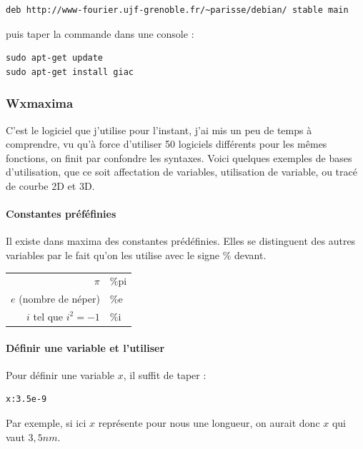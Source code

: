 \documentclass[a4paper,twoside]{article}
\begin{document}
\begin{verbatim}
deb http://www-fourier.ujf-grenoble.fr/~parisse/debian/ stable main
\end{verbatim}

puis taper la commande dans une console :

\begin{verbatim}
sudo apt-get update
sudo apt-get install giac
\end{verbatim}


\subsubsection{Wxmaxima}
C'est le logiciel que j'utilise pour l'instant, j'ai mis un peu de temps à comprendre, vu qu'à force d'utiliser 50 logiciels différents pour les mêmes fonctions, on finit par confondre les syntaxes. Voici quelques exemples de bases d'utilisation, que ce soit affectation de variables, utilisation de variable, ou tracé de courbe 2D et 3D.

\paragraph{Constantes préféfinies}\label{maxima:constantes}
Il existe dans maxima des constantes prédéfinies. Elles se distinguent des autres variables par le fait qu'on les utilise avec le signe \og \% \fg devant.



\begin{tabular}{rl}
$\pi$&\%pi\\
$e$ (nombre de néper)&\%e\\
$i$ tel que $i^2=-1$&\%i
\end{tabular}

\paragraph{Définir une variable et l'utiliser}

Pour définir une variable $x$, il suffit de taper :

\begin{verbatim}
x:3.5e-9
\end{verbatim}

\begin{remarque}
Par exemple, si ici $x$ représente pour nous une longueur, on aurait donc $x$ qui vaut $3,5\unit{nm}$.
\end{remarque}
\end{document}
